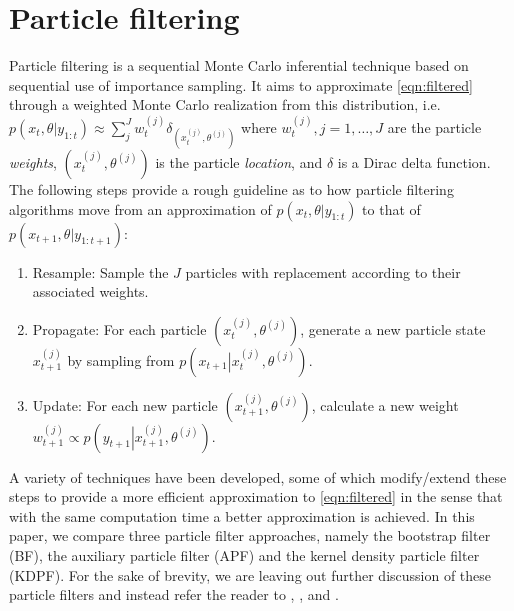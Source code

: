 \documentclass[useAMS,referee,usenatbib]{biom}
\begin{document}
\section{Particle filtering \label{sec:filtering}}

Particle filtering is a sequential Monte Carlo inferential technique based on sequential use of importance sampling. It aims to approximate \eqref{eqn:filtered} through a weighted Monte Carlo realization from this distribution, i.e. $p(x_t,\theta| y_{1:t}) \approx \sum_{j}^J w_t^{(j)} \delta_{(x_t^{(j)},\theta^{(j)})}$ where $w_t^{(j)},j=1,\ldots,J$ are the particle \emph{weights}, $(x_t^{(j)},\theta^{(j)})$ is the particle \emph{location}, and $\delta$ is a Dirac delta function. The following steps provide a rough guideline as to how particle filtering algorithms move from an approximation of $p(x_t,\theta| y_{1:t})$ to that of $p(x_{t+1},\theta| y_{1:t+1})$:

\begin{enumerate}
\item Resample: Sample the $J$ particles with replacement according to their associated weights.
\item Propagate: For each particle $(x_t^{(j)},\theta^{(j)})$, generate a new particle state $x_{t+1}^{(j)}$ by sampling from $p\left(\left. x_{t+1}\right|x_t^{(j)},\theta^{(j)}\right)$.
\item Update: For each new particle $(x_{t+1}^{(j)},\theta^{(j)})$, calculate a new weight $w_{t+1}^{(j)} \propto p\left(\left. y_{t+1}\right|x_{t+1}^{(j)},\theta^{(j)}\right)$.
\end{enumerate}

A variety of techniques have been developed, some of which modify/extend these steps to provide a more efficient approximation to \eqref{eqn:filtered} in the sense that with the same computation time a better approximation is achieved. In this paper, we compare three particle filter approaches, namely the bootstrap filter (BF), the auxiliary particle filter (APF) and the kernel density particle filter (KDPF).  For the sake of brevity, we are leaving out further discussion of these particle filters and instead refer the reader to \citet{Gord:Salm:Smit:nove:1993}, \citet{Pitt:Shep:filt:1999}, and \citet{Liu:West:comb:2001}.

\end{document}

